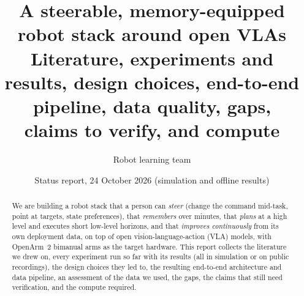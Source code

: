 \documentclass[10pt,a4paper]{article}
\title{\textbf{A steerable, memory-equipped robot stack around open VLAs}\\[2pt]
\large Literature, experiments and results, design choices, end-to-end pipeline, data quality, gaps,\\ claims to verify, and compute}
\author{Robot learning team}
\date{Status report, 24 October 2026 (simulation and offline results)}
\begin{document}
\maketitle

\begin{abstract}
\noindent
We are building a robot stack that a person can \emph{steer} (change the command mid-task, point at targets, state preferences), that \emph{remembers} over minutes, that \emph{plans} at a high level and executes short low-level horizons, and that \emph{improves continuously} from its own deployment data, on top of open vision-language-action (VLA) models, with OpenArm~2 bimanual arms as the target hardware.
This report collects the literature we drew on, every experiment run so far with its results (all in simulation or on public recordings), the design choices they led to, the resulting end-to-end architecture and data pipeline, an assessment of the data we used, the gaps, the claims that still need verification, and the compute required.

\end{abstract}
\end{document}
